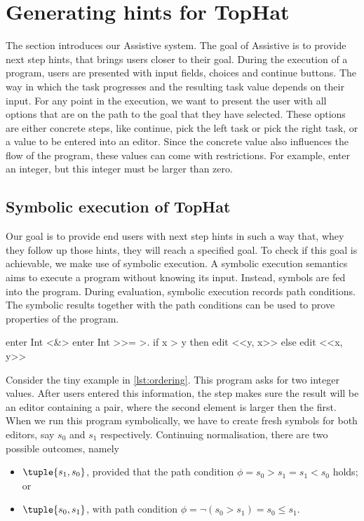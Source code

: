 
\section{Generating hints for TopHat}
\label{sec:assistive}
The section introduces our Assistive \TOPHAT system.
The goal of Assistive \TOPHAT is to provide next step hints, that brings users closer to their goal.
During the execution of a \TOPHAT program, users are presented with input fields, choices and continue buttons.
The way in which the task progresses and the resulting task value depends on their input.
For any point in the execution, we want to present the user with all options that are on the path to the goal that they have selected.
These options are either concrete steps, like continue, pick the left task or pick the right task,
or a value to be entered into an editor.
Since the concrete value also influences the flow of the program, these values can come with restrictions.
For example, enter an integer, but this integer must be larger than zero.

\subsection{Symbolic execution of TopHat}
\label{sec:symbolic}

Our goal is to provide end users with next step hints in such a way that, whey they follow up those hints, they will reach a specified goal.
To check if this goal is achievable, we make use of symbolic execution.
A symbolic execution semantics~\cite{King1975,Boyer1975} aims to execute a program without knowing its input.
Instead, symbols are fed into the program.
During evaluation, symbolic execution records path conditions.
The symbolic results together with the path conditions can be used to prove properties of the program.

\begin{TASK}[
    float=ht,
    caption={Ordering of tuple elements.},
    captionpos=b,
    label=lst:ordering]
  enter Int <&> enter Int >>= >. if x > y then edit <<y, x>> else edit <<x, y>>
\end{TASK}

Consider the tiny example in \cref{lst:ordering}.
This program asks for two integer values.
After users entered this information, the step makes sure the result will be an editor containing a pair,
where the second element is larger then the first.
When we run this program symbolically, we have to create fresh symbols for both editors, say $s_0$ and $s_1$ respectively.
Continuing normalisation, there are two possible outcomes, namely
\begin{itemize}
  \item $\tuple{s_1,s_0}$, provided that the path condition $\phi = s_0 > s_1 = s_1 < s_0$ holds; or
  \item $\tuple{s_0,s_1}$, with path condition $\phi = \lnot (s_0 > s_1) = s_0 \leq s_1$.
\end{itemize}

